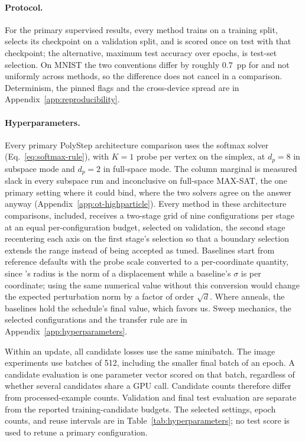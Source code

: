 \paragraph{Protocol.}
For the primary supervised results, every method trains on a training split, selects its
checkpoint on a validation split, and is scored once on test with that
checkpoint; the alternative, maximum test accuracy over epochs, is test-set
selection. On MNIST the two conventions differ by roughly $0.7$~pp for \sysname{} and
not uniformly across methods, so the difference does not cancel in a comparison.
Determinism, the pinned flags and the cross-device spread are in
Appendix~\ref{app:reproducibility}.

\paragraph{Hyperparameters.}
Every primary PolyStep architecture comparison uses the softmax solver (Eq.~\ref{eq:softmax-rule}), with
$K{=}1$ probe per vertex on the simplex, at $d_p{=}8$ in subspace mode and $d_p{=}2$ in
full-space mode. The column marginal is measured slack in every subspace run and
inconclusive on full-space MAX-SAT, the one primary setting where it could bind, where
the two solvers agree on the answer anyway (Appendix~\ref{app:ot-highparticle}). Every
method in these architecture comparisons, \sysname{} included, receives a two-stage grid of nine configurations per stage
at an equal per-configuration budget, selected on validation, the second stage
recentering each axis on the first stage's selection so that a boundary selection
extends the range instead of being accepted as tuned. Baselines start from reference
defaults with the probe scale converted to a per-coordinate quantity, since \sysname{}'s
radius is the norm of a displacement while a baseline's $\sigma$ is per coordinate;
using the same numerical value without this conversion would change the
expected perturbation norm by a factor of order $\sqrt d$. Where
\sysname{} anneals, the baselines hold the schedule's final value, which favors us.
Sweep mechanics, the selected configurations and the transfer rule are in
Appendix~\ref{app:hyperparameters}.

Within an update, all candidate losses use the same minibatch. The image
experiments use batches of 512, including the smaller final batch of an epoch.
A candidate evaluation is one parameter vector scored on that batch, regardless
of whether several candidates share a GPU call. Candidate counts therefore
differ from processed-example counts. Validation and final test evaluation are
separate from the reported training-candidate budgets. The selected settings,
epoch counts, and reuse intervals are in Table~\ref{tab:hyperparameters};
no test score is used to retune a primary configuration.


